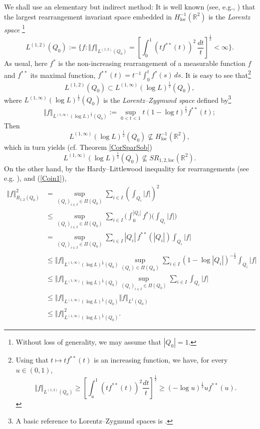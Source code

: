 \documentclass[11pt, a4paper,leqno]{amsart}
\theoremstyle{plain}
\numberwithin{equation}{section}
\theoremstyle{definition}
\theoremstyle{remark}
\begin{document}
We shall use an elementary but indirect method: It is well known (see, e.g.,
\cite[p. 141]{Lio96}) that the largest rearrangement invariant space embedded
in $H_{\text{loc}}^{-1}(\mathbb{R}^{2})$ is the \emph{Lorentz space}%
\footnote{Without loss of generality, we may assume that $|Q_{0}|=1$.}
\[
L^{(1,2)}(Q_{0}):=\bigg\{f:\left\Vert f\right\Vert _{L^{(1,2)}(Q_{0})}=\left[
\int_{0}^{1}(tf^{\ast\ast}(t))^{2} \, \frac{dt}{t}\right]  ^{\frac{1}{2}}%
<\infty\bigg\}.
\]
As usual, here $f^{\ast}$ is the non-increasing rearrangement of a measurable
function $f$ and $f^{\ast\ast}$ its maximal function, $f^{\ast\ast}%
(t)=t^{-1}\int_{0}^{t}f^{\ast}(s)\,ds$. It is easy to see that\footnote{Using
that $t\mapsto tf^{**}(t)$ is an increasing function, we have, for every
$u\in(0,1)$,
\[
\Vert f\Vert_{L^{(1,2)}(Q_{0})}\geq\left[  \int_{u}^{1}(tf^{**}(t))^{2}%
\frac{dt}{t}\right]  ^{\frac{1}{2}}\geq(-\log u)^{\frac{1}{2}}uf^{**}(u).
\]
}
\[
L^{(1,2)}(Q_{0})\subset L^{(1,\infty)}(\log L)^{\frac{1}{2}}(Q_{0}),
\]
where $L^{(1,\infty)}(\log L)^{\frac{1}{2}}(Q_{0})$ is the
\emph{Lorentz--Zygmund space} defined by\footnote{A basic reference to
Lorentz--Zygmund spaces is \cite{BR80}.}
\[
\left\Vert f\right\Vert _{L^{(1,\infty)}(\log L)^{\frac{1}{2}}(Q_{0})}%
:=\sup_{0<t<1}t(1-\log t)^{\frac{1}{2}}f^{\ast\ast}(t);
\]
Then 
\[
L^{(1,\infty)}(\log L)^{\frac{1}{2}}(Q_{0})\nsubseteq H_{\text{loc}}%
^{-1}(\mathbb{R}^{2}),
\]
which in turn yields (cf. Theorem \ref{CorSparSob})
\begin{equation}
L^{(1,\infty)}(\log L)^{\frac{1}{2}}(Q_{0})\nsubseteq SR_{1,2,\text{loc}%
}(\mathbb{R}^{2}).\label{Coin1}%
\end{equation}
On the other hand, by the Hardy--Littlewood inequality for rearrangements (see
e.g. \cite[Lemma 2.1, p. 44]{BS88}), and (\ref{Coin1}),
\begin{align*}
\left\Vert f\right\Vert _{R_{1,2}(Q_{0})}^{2} &  =\sup_{(Q_{i})_{i\in I}\in
\Pi(Q_{0})}\sum_{i\in I}\left(  \int_{Q_{i}}\left\vert f\right\vert \right)
^{2}\\
&  \leq\sup_{(Q_{i})_{i\in I}\in\Pi(Q_{0})}\sum_{i\in I} \bigg(\int_{0}^{|Q_{i}%
|}f^{\ast} \bigg)\bigg(  \int_{Q_{i}}\left\vert f\right\vert \bigg)  \\
&  =\sup_{(Q_{i})_{i\in I}\in\Pi(Q_{0})}\sum_{i\in I}|Q_{i}|\,f^{\ast\ast
}(|Q_{i}|)\int_{Q_{i}}\left\vert f\right\vert \\
&  \leq\left\Vert f\right\Vert _{L^{(1,\infty)}(\log L)^{\frac{1}{2}}(Q_{0}%
)}\sup_{(Q_{i})\in\Pi(Q_{0})}\sum_{i\in I}(1-\log|Q_{i}|)^{-\frac{1}{2}}%
\int_{Q_{i}}\left\vert f\right\vert \\
&  \leq\left\Vert f\right\Vert _{L^{(1,\infty)}(\log L)^{\frac{1}{2}}(Q_{0}%
)}\sup_{(Q_{i})_{i\in I}\in\Pi(Q_{0})}\sum_{i\in I}\int_{Q_{i}}\left\vert
f\right\vert \\
&  \leq\left\Vert f\right\Vert _{L^{(1,\infty)}(\log L)^{\frac{1}{2}}(Q_{0}%
)}\left\Vert f\right\Vert _{L^{1}(Q_{0})}\\
&  \leq\left\Vert f\right\Vert _{L^{(1,\infty)}(\log L)^{\frac{1}{2}}(Q_{0}%
)}^{2}.
\end{align*}
\end{document}

